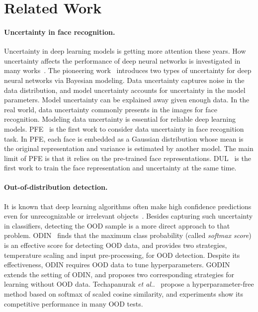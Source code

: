 \documentclass[letterpaper]{article} %
\makeatletter
\DeclareRobustCommand\onedot{\futurelet\@let@token\@onedot}
\def\@onedot{\ifx\@let@token.\else.\null\fi\xspace}
\def\etal{\emph{et al}\onedot}
\makeatother
\begin{document}
\section{Related Work}
\label{sec:related}

\paragraph{Uncertainty in face recognition.}
%
Uncertainty in deep learning models is getting more attention these years. How uncertainty affects the performance of deep neural networks is investigated in many works~\cite{gal2016dropout,blundell2015weight,kendall2017uncertainties}.
%
The pioneering work~\cite{kendall2017uncertainties} introduces two types of uncertainty for deep neural networks via Bayesian modeling. Data uncertainty captures noise in the data distribution, and model uncertainty accounts for uncertainty in the model parameters. Model uncertainty can be explained away given enough data. 
%
In the real world, data uncertainty commonly presents in the images for face recognition. Modeling data uncertainty is essential for reliable deep learning models. 
%
PFE~\cite{shi2019probabilistic} is the first work to consider data uncertainty in face recognition task. In PFE, each face is embedded as a Gaussian distribution whose mean is the original representation and variance is estimated by another model. The main limit of PFE is that it relies on the pre-trained face representations. 
%
DUL~\cite{chang2020data} is the first work to train the face representation and uncertainty at the same time. 

\paragraph{Out-of-distribution detection.}
It is known that deep learning algorithms often make high confidence predictions even for unrecognizable or irrelevant objects~\cite{moosavi2017universal,nguyen2015deep}. Besides capturing such uncertainty in classifiers, detecting the OOD sample is a more direct approach to that problem. 
%
ODIN~\cite{liang2018enhancing} finds that the maximum class probability (called \emph{softmax score}) is an effective score for detecting OOD data, and provides two strategies, temperature scaling and input pre-processing, for OOD detection. Despite its effectiveness, ODIN requires OOD data to tune hyperparameters.
%
GODIN~\cite{hsu2020generalized} extends the setting of ODIN, and proposes two corresponding strategies for learning without OOD data.
%
Techapanurak \etal~\cite{techapanurak2019hyperparameter} propose a hyperparameter-free method based on softmax of scaled cosine similarity, and experiments show its competitive performance in many OOD tests.
\end{document}

